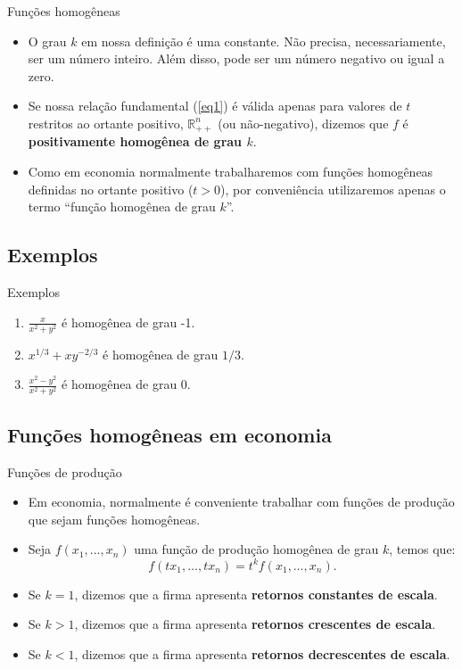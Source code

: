 \documentclass[10pt]{beamer}
\begin{document}
\begin{frame}{Funções homogêneas}
    \begin{itemize}
        \item O grau $k$ em nossa definição é uma constante. Não precisa, necessariamente, ser um número inteiro. Além disso, pode ser um número negativo ou igual a zero.
        \bigskip
        \item Se nossa relação fundamental (\ref{eq1}) é válida apenas para valores de $t$ restritos ao ortante positivo, $\mathbb{R}_{++}^n$ (ou não-negativo), dizemos que $f$ é \textbf{positivamente homogênea de grau $k$}.
        \bigskip
        \item Como em economia normalmente trabalharemos com funções homogêneas definidas no ortante positivo ($t > 0$), por conveniência utilizaremos apenas o termo ``função homogênea de grau $k$''.
    \end{itemize}
\end{frame}

\subsection{Exemplos}
\begin{frame}{Exemplos}
    \begin{enumerate}
        \item $\frac{x}{x^2 + y^2}$ é homogênea de grau -1.
        \bigskip
        \item $x^{1/3} + xy^{-2/3}$ é homogênea de grau $1/3$.
        \bigskip
        \item $\frac{x^2 - y^2}{x^2 + y^2}$ é homogênea de grau 0.
    \end{enumerate}
\end{frame}

\subsection{Funções homogêneas em economia}
\begin{frame}{Funções de produção}
    \begin{itemize}
        \item Em economia, normalmente é conveniente trabalhar com funções de produção que sejam funções homogêneas.
        \bigskip
        \item Seja $f(x_1, \dots, x_n)$ uma função de produção homogênea de grau $k$, temos que:
        \[
        f(tx_1, \dots, tx_n) = t^kf(x_1, \dots, x_n).
        \]
         
        \item Se $k = 1$, dizemos que a firma apresenta \textbf{retornos constantes de escala}.
        \bigskip
        \item Se $k > 1$, dizemos que a firma apresenta \textbf{retornos crescentes de escala}.
        \bigskip
        \item Se $k < 1$, dizemos que a firma apresenta \textbf{retornos decrescentes de escala}.
    \end{itemize}
\end{frame}
\end{document}
